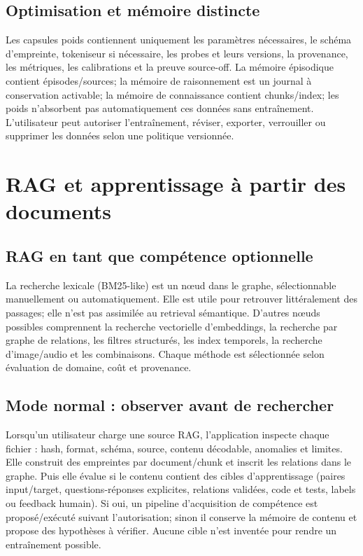 \documentclass[11pt,a4paper,oneside]{report}
\begin{document}
\section{Optimisation et mémoire distincte}
Les capsules poids contiennent uniquement les paramètres nécessaires, le schéma d'empreinte, tokeniseur si nécessaire, les probes et leurs versions, la provenance, les métriques, les calibrations et la preuve source-off. La mémoire épisodique contient épisodes/sources; la mémoire de raisonnement est un journal à conservation activable; la mémoire de connaissance contient chunks/index; les poids n'absorbent pas automatiquement ces données sans entraînement. L'utilisateur peut autoriser l'entraînement, réviser, exporter, verrouiller ou supprimer les données selon une politique versionnée.

\chapter{RAG et apprentissage à partir des documents}
\section{RAG en tant que compétence optionnelle}
La recherche lexicale (BM25-like) est un nœud dans le graphe, sélectionnable manuellement ou automatiquement. Elle est utile pour retrouver littéralement des passages; elle n'est pas assimilée au retrieval sémantique. D'autres nœuds possibles comprennent la recherche vectorielle d'embeddings, la recherche par graphe de relations, les filtres structurés, les index temporels, la recherche d'image/audio et les combinaisons. Chaque méthode est sélectionnée selon évaluation de domaine, coût et provenance.

\section{Mode normal : observer avant de rechercher}
Lorsqu'un utilisateur charge une source RAG, l'application inspecte chaque fichier : hash, format, schéma, source, contenu décodable, anomalies et limites. Elle construit des empreintes par document/chunk et inscrit les relations dans le graphe. Puis elle évalue si le contenu contient des cibles d'apprentissage (paires input/target, questions-réponses explicites, relations validées, code et tests, labels ou feedback humain). Si oui, un pipeline d'acquisition de compétence est proposé/exécuté suivant l'autorisation; sinon il conserve la mémoire de contenu et propose des hypothèses à vérifier. Aucune cible n'est inventée pour rendre un entraînement possible.
\end{document}

